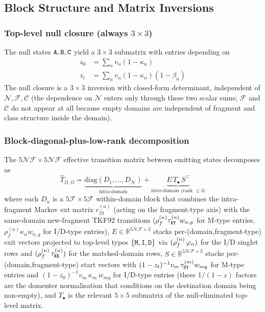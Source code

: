 \documentclass{article}
\newcommand\ext{r}
\newcommand\notext{\rho}
\newcommand\dom{n}
\newcommand\ndom{\mathcal{N}}
\newcommand\nfrag{\mathcal{F}}
\newcommand\domdist{v}
\newcommand\fragdist{w}
\newcommand\evoltime{t}
\newcommand\tkftrans{\tau}
\newcommand\emptyseg{z}
\newcommand\nonemptytrans{T}
\newcommand\sta{{\tt S}}
\newcommand\mat{{\tt M}}
\newcommand\ins{{\tt I}}
\newcommand\del{{\tt D}}
\newcommand\fin{{\tt E}}
\newcommand\mnull{{\tt A}}
\newcommand\inull{{\tt B}}
\newcommand\dnull{{\tt C}}
\newcommand\emit{\Omega}
\newcommand\effT{\hat{T}}
\newcommand\xstate{{\tt X}}
\newcommand\ystate{{\tt Y}}
\newcommand\destdom{m}
\newcommand\srcfrag{f}
\newcommand\destfrag{g}
\newcommand\nclasses{\mathcal{C}}
\begin{document}
\subsection{Block Structure and Matrix Inversions}

\subsubsection{\texorpdfstring{Top-level null closure (always $3 \times 3$)}{Top-level null closure (always 3 x 3)}}

The null states $\mnull, \inull, \dnull$ yield a $3 \times 3$ submatrix
with entries depending on
\begin{align*}
\emptyseg_0 &= \sum_\dom \domdist_\dom(1 - \kappa_\dom) \\
\emptyseg_\evoltime &= \sum_\dom \domdist_\dom(1 - \kappa_\dom)(1 - \beta_\dom)
\end{align*}
The null closure is a $3 \times 3$ inversion with closed-form
determinant, independent of $\ndom, \nfrag, \nclasses$ (the dependence
on $\ndom$ enters only through these two scalar sums; $\nfrag$ and
$\nclasses$ do not appear at all because empty domains are independent
of fragment and class structure inside the domain).

\subsubsection{Block-diagonal-plus-low-rank decomposition}

The $5\ndom\nfrag \times 5\ndom\nfrag$ effective transition matrix
between emitting states decomposes as
\[
\effT_{\emit,\emit}
= \underbrace{\mathrm{diag}(D_1, \ldots, D_\ndom)}_{\text{intra-domain}}
+ \underbrace{E\,\nonemptytrans_\bullet\, S^\top}_{\text{inter-domain (rank } \leq 3\text{)}}
\]
where each $D_\dom$ is a $5\nfrag \times 5\nfrag$ within-domain block
that combines the intra-fragment Markov ext matrix
$\ext^{(\dom)}_{\srcfrag\destfrag}$ (acting on the fragment-type axis)
with the same-domain new-fragment TKF92 transitions
($\notext^{(\dom)}_\srcfrag \tkftrans^{(\dom)}_{\xstate\ystate}
\fragdist_{\dom,\destfrag}$ for M-type entries,
$\notext^{(\dom)}_\srcfrag \kappa_\dom \fragdist_{\dom,\destfrag}$ for
I/D-type entries),
$E \in \mathbb{R}^{5\ndom\nfrag \times 3}$ stacks per-(domain,fragment-type)
exit vectors projected to top-level types $\{\mat,\ins,\del\}$ via
$(\notext^{(\dom)}_\srcfrag\, \notkappa_\dom)$ for the I/D singlet rows
and $(\notext^{(\dom)}_\srcfrag\, \tkftrans^{(\dom)}_{\xstate\fin})$ for
the matched-domain rows,
$S \in \mathbb{R}^{5\ndom\nfrag \times 3}$ stacks per-(domain,fragment-type)
start vectors with $(1-\emptyseg_\evoltime)^{-1}\domdist_\destdom\,
\tkftrans^{(\destdom)}_{\sta\ystate}\fragdist_{\destdom\destfrag}$ for
M-type entries and $(1-\emptyseg_0)^{-1}\domdist_\destdom\, \kappa_\destdom\,
\fragdist_{\destdom\destfrag}$ for I/D-type entries (these
$1/(1-\emptyseg)$ factors are the domenter normalisation that conditions
on the destination domain being non-empty),
and $\nonemptytrans_\bullet$ is the relevant $5 \times 5$ submatrix of
the null-eliminated top-level matrix.
\end{document}
